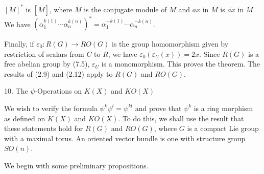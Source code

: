 $[M]^*$ is $[\overline{M}]$, where $\overline{M}$ is the conjugate module of $M$ and $ax$ in $\overline{M}$ is $\bar{ax}$ in $M$. We have $(\alpha_1^{k(1)} \cdots \alpha_n^{k(n)})^* = \alpha_1^{-k(1)} \cdots \alpha_n^{-k(n)}.$

Finally, if $\varepsilon_0: R(G) \rightarrow RO(G)$ is the group homomorphism given by restriction of scalars from $C$ to $R$, we have $\varepsilon_0(\varepsilon_U(x)) = 2x$. Since $R(G)$ is a free abelian group by (7.5), $\varepsilon_U$ is a monomorphism. This proves the theorem. The results of (2.9) and (2.12) apply to $R(G)$ and $RO(G).$

10. The $\psi$-Operations on $K(X)$ and $KO(X)$

We wish to verify the formula $\psi^k \psi^l = \psi^{kl}$ and prove that $\psi^k$ is a ring morphism as defined on $K(X)$ and $KO(X).$ To do this, we shall use the result that these statements hold for $R(G)$ and $RO(G)$, where $G$ is a compact Lie group with a maximal torus. An oriented vector bundle is one with structure group $SO(n).$

We begin with some preliminary propositions.
